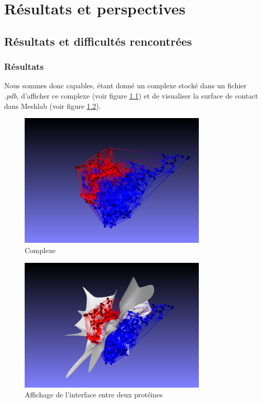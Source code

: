 \chapter{Résultats et perspectives}

\section{Résultats et difficultés rencontrées}

\subsection*{Résultats}


Nous sommes donc capables, étant donné un complexe stocké dans un fichier \textit{.pdb},
d'afficher ce complexe (voir figure \ref{fig::complexe}) et de visualiser la surface
de contact dans Meshlab (voir figure \ref{fig::affichage_final}).

\begin{figure}[ht]
\centering
  \includegraphics[width=0.8\textwidth]{figures/final_no_surf.png}
  \caption{Complexe}
  \label{fig::complexe}
\end{figure}

\begin{figure}[ht]
\centering
  \includegraphics[width=0.8\textwidth]{figures/final_with_surf.png}
  \caption{Affichage de l'interface entre deux protéines}
  \label{fig::affichage_final}
\end{figure}


